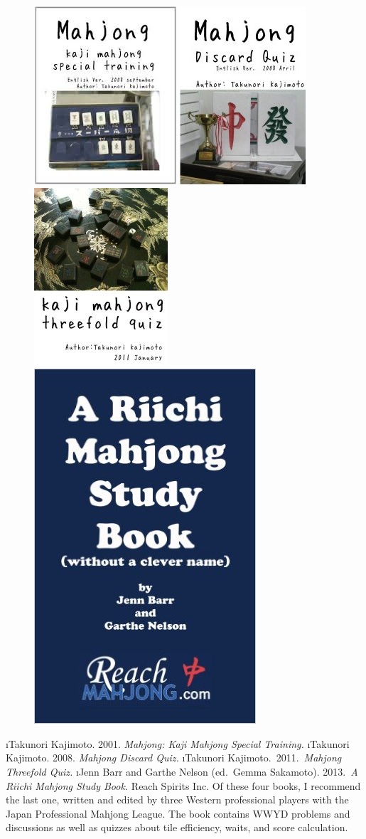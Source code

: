 \begin{figure}
\begin{center}
\includegraphics[height=.33\textwidth,clip]{figs/kaji1}
\includegraphics[height=.33\textwidth,clip]{figs/kaji2}
\includegraphics[height=.33\textwidth,clip]{figs/kaji3}
\includegraphics[height=.33\textwidth,clip]{figs/barr2}
\end{center}
\end{figure}



\be \setcounter{enumi}{1}
\i Takunori Kajimoto. 2001. \textit{Mahjong: Kaji Mahjong Special Training.}
\i Takunori Kajimoto. 2008. \textit{Mahjong Discard Quiz.}
\i Takunori Kajimoto.~2011.~\textit{Mahjong Threefold Quiz.}
\i Jenn Barr and Garthe Nelson (ed.~Gemma Sakamoto). 2013.~\textit{A Riichi Mahjong Study Book.} Reach Spirits Inc.
\ee {}
Of these four books, I recommend the last one, written and edited by three Western professional players with the Japan Professional Mahjong League. The book contains WWYD problems and discussions as well as quizzes about tile efficiency, waits, and score calculation.

